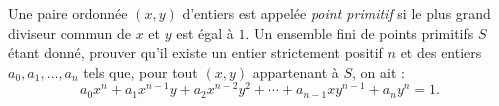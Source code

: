 Une paire ordonnée $(x, y)$ d'entiers est appelée \emph{point primitif} si le plus grand diviseur commun de
$x$ et $y$ est égal à $1$. Un ensemble fini de points primitifs $S$ étant donné, prouver qu'il existe un entier
strictement positif $n$ et des entiers $a_0, a_1, \ldots, a_n$ tels que, pour tout $(x, y)$ appartenant à
$S$, on ait :
\[
a_0x^n + a_1x^{n-1}y + a_2x^{n-2}y^2 + \cdots + a_{n-1}xy^{n-1} + a_ny^n = 1.
\]

